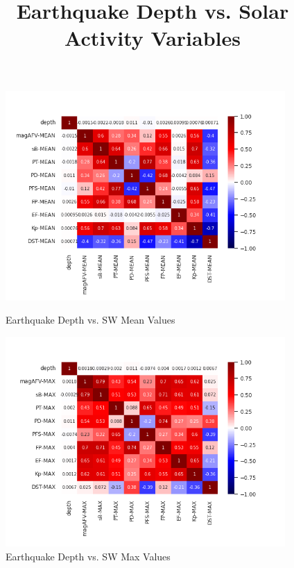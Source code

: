\documentclass[12pt]{article}
\begin{document}
\begin{figure}
\begin{large}
\title{Earthquake Depth vs. Solar Activity Variables}
\end{large}
\centering
  \includegraphics[width=0.95\textwidth]{corr-depth-MEAN.png}
  \caption{Earthquake Depth vs. SW Mean Values}

  \includegraphics[width=0.95\textwidth]{corr-depth-MAX.png}
  \caption{Earthquake Depth vs. SW Max Values}
\end{figure}

\newpage
\end{document}
